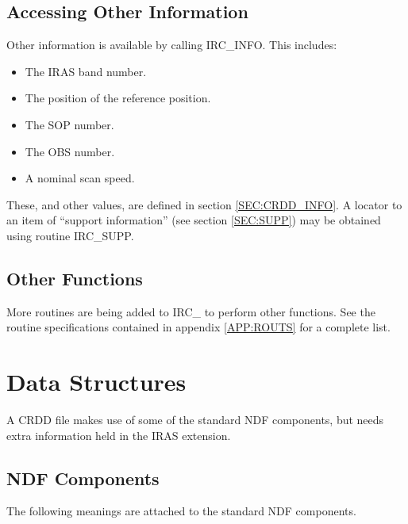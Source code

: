 \subsection {Accessing Other Information}
Other information is available by calling IRC\_INFO. This includes:

\begin{itemize}

\item The IRAS band number.

\item The position of the reference position.

\item The SOP number.

\item The OBS number.

\item A nominal scan speed.

\end{itemize}

These, and other values, are defined in section \ref {SEC:CRDD_INFO}. A locator
to an item of ``support information'' (see section \ref{SEC:SUPP}) may be
obtained using routine IRC\_SUPP.

\subsection {Other Functions}
More routines are being added to IRC\_ to perform other functions. See
the routine specifications contained in appendix \ref {APP:ROUTS} for
a complete list.

\section {Data Structures}
A CRDD file makes use of some of the standard NDF components, but
needs extra information held in the IRAS extension.

\subsection {NDF Components}
The following meanings are attached to the standard NDF components.

